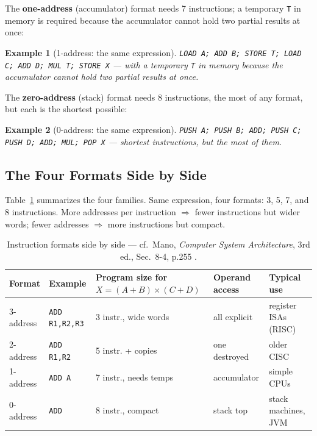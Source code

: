 \documentclass[11pt]{article}
\newtheorem{example}{Example}[section]
\begin{document}
The \textbf{one-address} (accumulator) format needs 7 instructions; a temporary \texttt{T} in memory is required because the accumulator cannot hold two partial results at once:
\begin{example}[1-address: the same expression]
\texttt{LOAD A; ADD B; STORE T; LOAD C; ADD D; MUL T; STORE X} --- with a temporary \texttt{T} in memory because the accumulator cannot hold two partial results at once.
\end{example}

The \textbf{zero-address} (stack) format needs 8 instructions, the most of any format, but each is the shortest possible:
\begin{example}[0-address: the same expression]
\texttt{PUSH A; PUSH B; ADD; PUSH C; PUSH D; ADD; MUL; POP X} --- shortest instructions, but the most of them.
\end{example}

\subsection{The Four Formats Side by Side}

Table~\ref{tab:format-comparison} summarizes the four families. Same expression, four formats: 3, 5, 7, and 8 instructions. More addresses per instruction $\Rightarrow$ fewer instructions but wider words; fewer addresses $\Rightarrow$ more instructions but compact.

\begin{table}[h]
\centering
\small
\renewcommand{\arraystretch}{1.15}
\begin{tabular}{@{}p{1.8cm}p{2.4cm}p{4.0cm}p{2.2cm}p{2.6cm}@{}}
\toprule
\textbf{Format} & \textbf{Example} & \textbf{Program size for }$X=(A{+}B)\times(C{+}D)$ & \textbf{Operand access} & \textbf{Typical use} \\
\midrule
3-address & \texttt{ADD R1,R2,R3} & 3 instr., wide words & all explicit & register ISAs (RISC) \\
2-address & \texttt{ADD R1,R2}    & 5 instr. + copies     & one destroyed      & older CISC \\
1-address & \texttt{ADD A}        & 7 instr., needs temps & accumulator        & simple CPUs \\
0-address & \texttt{ADD}          & 8 instr., compact    & stack top          & stack machines, JVM \\
\bottomrule
\end{tabular}
\caption{Instruction formats side by side --- cf.\ Mano, \textit{Computer System Architecture}, 3rd ed., Sec.~8-4, p.255 \cite{Mano1993_computer_system_architecture}.}
\label{tab:format-comparison}
\end{table}
\end{document}
